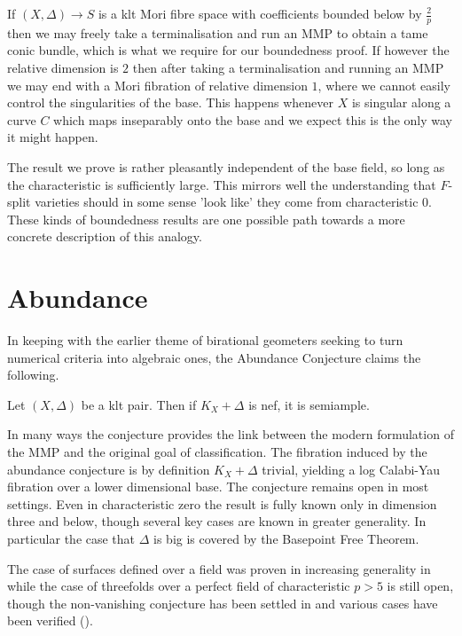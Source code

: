\documentclass[a4paper,12pt]{book}
\let \OldSection \section
\renewcommand{\section}[1]{\OldSection{#1} \thispagestyle{section}}
\begin{document}
	If $(X,\Delta) \to S$ is a klt Mori fibre space with coefficients bounded below by $\frac{2}{p}$ then we may freely take a terminalisation and run an MMP to obtain a tame conic bundle, which is what we require for our boundedness proof. If however the relative dimension is $2$ then after taking a terminalisation and running an MMP we may end with a Mori fibration of relative dimension $1$, where we cannot easily control the singularities of the base. This happens whenever $X$ is singular along a curve $C$ which maps inseparably onto the base and we expect this is the only way it might happen. 
	
	
	The result we prove is rather pleasantly independent of the base field, so long as the characteristic is sufficiently large. This mirrors well the understanding that $F$-split varieties should in some sense 'look like' they come from characteristic $0$. These kinds of boundedness results are one possible path towards a more concrete description of this analogy.
	
	

	\section{Abundance}
	
	In keeping with the earlier theme of birational geometers seeking to turn numerical criteria into algebraic ones, the Abundance Conjecture claims the following.
	
	\begin{conjecture*}
		
		Let $(X,\Delta)$ be a klt pair. Then if $K_{X}+\Delta$ is nef, it is semiample.	
		\end{conjecture*}
	
	In many ways the conjecture provides the link between the modern formulation of the MMP and the original goal of classification. The fibration induced by the abundance conjecture is by definition $K_{X}+\Delta$ trivial, yielding a log Calabi-Yau fibration over a lower dimensional base. The conjecture remains open in most settings. Even in characteristic zero the result is fully known only in dimension three and below, though several key cases are known in greater generality. In particular the case that $\Delta$ is big is covered by the Basepoint Free Theorem.

	The case of surfaces defined over a field was proven in increasing generality in \cite{fujino2012log, Tan14, tanaka2020abundance} while the case of threefolds over a perfect field of characteristic $p>5$ is still open, though the non-vanishing conjecture has been settled in \cite{XZ19, Wit} and various cases have been verified (\cite{DW19, Zha20}).
	
\end{document}
